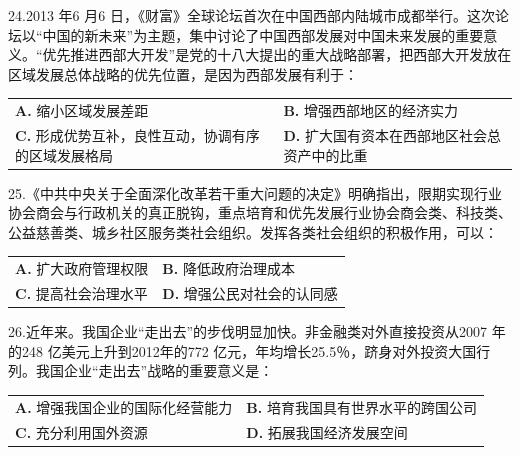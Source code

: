 \documentclass[UTF8,11pt]{ctexart}
\begin{document}
24.2013 年6 月6 日，《财富》全球论坛首次在中国西部内陆城市成都举行。这次论坛以“中国的新未来”为主题，集中讨论了中国西部发展对中国未来发展的重要意义。“优先推进西部大开发”是党的十八大提出的重大战略部署，把西部大开发放在区域发展总体战略的优先位置，是因为西部发展有利于：


\begin{center}\begin{tabular}{>{\raggedright\arraybackslash}p{\dimexpr(\linewidth-4\tabcolsep)/2\relax}>{\raggedright\arraybackslash}p{\dimexpr(\linewidth-4\tabcolsep)/2\relax}}
\textbf{A.} 缩小区域发展差距 & \textbf{B.} 增强西部地区的经济实力\\[.35em]
\textbf{C.} 形成优势互补，良性互动，协调有序的区域发展格局 & \textbf{D.} 扩大国有资本在西部地区社会总资产中的比重\\[.35em]\end{tabular}\end{center}

25.《中共中央关于全面深化改革若干重大问题的决定》明确指出，限期实现行业协会商会与行政机关的真正脱钩，重点培育和优先发展行业协会商会类、科技类、公益慈善类、城乡社区服务类社会组织。发挥各类社会组织的积极作用，可以：


\begin{center}\begin{tabular}{>{\raggedright\arraybackslash}p{\dimexpr(\linewidth-4\tabcolsep)/2\relax}>{\raggedright\arraybackslash}p{\dimexpr(\linewidth-4\tabcolsep)/2\relax}}
\textbf{A.} 扩大政府管理权限 & \textbf{B.} 降低政府治理成本\\[.35em]
\textbf{C.} 提高社会治理水平 & \textbf{D.} 增强公民对社会的认同感\\[.35em]\end{tabular}\end{center}

26.近年来。我国企业“走出去”的步伐明显加快。非金融类对外直接投资从2007 年的248 亿美元上升到2012年的772 亿元，年均增长25.5％，跻身对外投资大国行列。我国企业“走出去”战略的重要意义是：


\begin{center}\begin{tabular}{>{\raggedright\arraybackslash}p{\dimexpr(\linewidth-4\tabcolsep)/2\relax}>{\raggedright\arraybackslash}p{\dimexpr(\linewidth-4\tabcolsep)/2\relax}}
\textbf{A.} 增强我国企业的国际化经营能力 & \textbf{B.} 培育我国具有世界水平的跨国公司\\[.35em]
\textbf{C.} 充分利用国外资源 & \textbf{D.} 拓展我国经济发展空间\\[.35em]\end{tabular}\end{center}
\end{document}
